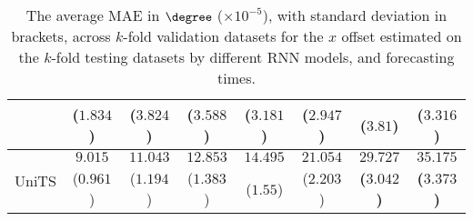 \begin{table}[!ht]
{\begin{tabular}{|c|c|c|c|c|c|c|c|}
			 & ($1.834$) & ($3.824$) & ($3.588$) & ($3.181$) & ($2.947$) & ($3.81$) & ($3.316$) \\ \hline
			\multirow{2}{*}{UniTS} & $9.015$ & $11.043$ & $12.853$ & $14.495$ & $21.054$ & $\mathbf{29.727}$ & $\mathbf{35.175}$ \\
			 & ($0.961$) & ($1.194$) & ($1.383$) & ($1.55$) & ($2.203$) & \textbf{(}$\mathbf{3.042}$\textbf{)} & \textbf{(}$\mathbf{3.373}$\textbf{)} \\ \hline
		\end{tabular}
	}
	\caption{The average MAE in $\degree$ ($\times 10^{-5}$), with standard deviation in brackets, across $k$-fold validation datasets for the $x$ offset estimated on the $k$-fold testing datasets by different RNN models, and forecasting times.}
	\label{tab:mann_whitney_longitude_no_abs_MAE}
\end{table}